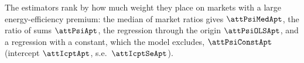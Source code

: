 The estimators rank by how much weight they place on markets with a large energy-efficiency premium: the median of market ratios gives $\attPsiMedApt$, the ratio of sums $\attPsiApt$, the regression through the origin $\attPsiOLSApt$, and a regression with a constant, which the model excludes, $\attPsiConstApt$ (intercept $\attIcptApt$, s.e.\ $\attIcptSeApt$).